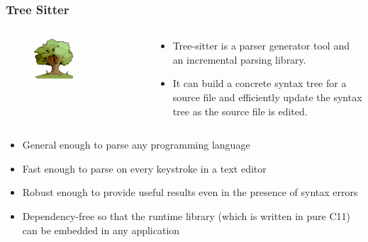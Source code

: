 \documentclass[dvipsnames, 10pt, table]{beamer}
\begin{document}
\begin{frame}
  \frametitle{Tree Sitter}
  \begin{columns}
    \begin{column}{0.5\textwidth}
      \begin{figure}
        \begin{center}
          \includegraphics[width=0.5\textwidth]{figures/solution/tree-sitter-logo.png}
        \end{center}
      \end{figure}
    \end{column}
    \begin{column}{0.5\textwidth}
      \begin{itemize}
        \item Tree-sitter is a parser generator tool and an incremental parsing library.
        \item It can build a concrete syntax tree for a source file and efficiently update the syntax tree as the source file is edited.
      \end{itemize}
    \end{column}
  \end{columns}
  \begin{itemize}
    \item General enough to parse any programming language
    \item Fast enough to parse on every keystroke in a text editor
    \item Robust enough to provide useful results even in the presence of syntax errors
    \item Dependency-free so that the runtime library (which is written in pure C11) can be embedded in any application
  \end{itemize}
\end{frame}
\end{document}
